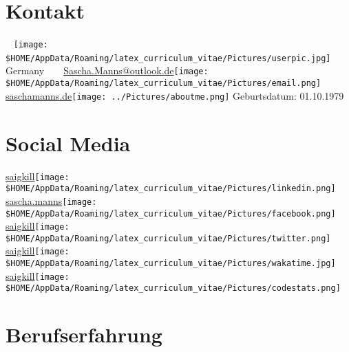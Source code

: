 \documentclass[a4paper]{friggeri-cv} %
\begin{document}


\begin{aside} %
\section{Kontakt}
~
\texttt{[image: \$HOME/AppData/Roaming/latex\_curriculum\_vitae/Pictures/userpic.jpg]}
~
\mystreet
\mycity
Germany
~
\myphone
~
\href{mailto:Sascha.Manns@outlook.de}{Sascha.Manns@outlook.de}\texttt{[image: \$HOME/AppData/Roaming/latex\_curriculum\_vitae/Pictures/email.png]}
\href{http://saschamanns.de}{saschamanns.de}\texttt{[image: ../Pictures/aboutme.png]}
Geburtsdatum: 01.10.1979
\section{Social Media}
\href{https://www.linkedin.com/in/saigkill}{saigkill}\texttt{[image: \$HOME/AppData/Roaming/latex\_curriculum\_vitae/Pictures/linkedin.png]}
\href{https://www.facebook.com/sascha.manns}{sascha.manns}\texttt{[image: \$HOME/AppData/Roaming/latex\_curriculum\_vitae/Pictures/facebook.png]}
\href{https://twitter.com/saigkill}{saigkill}\texttt{[image: \$HOME/AppData/Roaming/latex\_curriculum\_vitae/Pictures/twitter.png]}
\href{https://wakatime.com/@saigkill}{saigkill}\texttt{[image: \$HOME/AppData/Roaming/latex\_curriculum\_vitae/Pictures/wakatime.jpg]}
\href{https://codestats.net/users/saigkill}{saigkill}\texttt{[image: \$HOME/AppData/Roaming/latex\_curriculum\_vitae/Pictures/codestats.png]}
\end{aside}


\section{Berufserfahrung}
\end{document}
